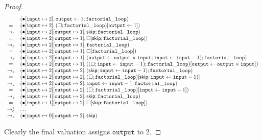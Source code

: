\documentclass{amsbook}
\theoremstyle{definition}
\theoremstyle{remark}
\numberwithin{section}{chapter}
\numberwithin{equation}{chapter}
\begin{document}
\begin{proof}
  $$\begin{array}{cl}
    & (\bullet[\mathtt{input} \mapsto 2], \mathtt{output} \leftarrow 1; \mathtt{factorial\_loop}) \\
    = & (\bullet[\mathtt{input} \mapsto 2], (\Box; \mathtt{factorial\_loop})[\mathtt{output} \leftarrow 1]) \\
    \to_\mathsf{c} & (\bullet[\mathtt{input} \mapsto 2][\mathtt{output} \mapsto 1], \mathsf{skip}; \mathtt{factorial\_loop}) \\
    = & (\bullet[\mathtt{input} \mapsto 2][\mathtt{output} \mapsto 1], \Box[\mathsf{skip}; \mathtt{factorial\_loop}]) \\
    \to_\mathsf{c} & (\bullet[\mathtt{input} \mapsto 2][\mathtt{output} \mapsto 1], \mathtt{factorial\_loop}) \\
    = & (\bullet[\mathtt{input} \mapsto 2][\mathtt{output} \mapsto 1], \Box[\mathtt{factorial\_loop}]) \\
    \to_\mathsf{c} & (\bullet[\mathtt{input} \mapsto 2][\mathtt{output} \mapsto 1], (\mathtt{output} \leftarrow \mathtt{output} \times \mathtt{input}; \mathtt{input} \leftarrow \mathtt{input} - 1); \mathtt{factorial\_loop}) \\
    = & (\bullet[\mathtt{input} \mapsto 2][\mathtt{output} \mapsto 1], ((\Box; \mathtt{input} \leftarrow \mathtt{input} - 1); \mathtt{factorial\_loop})[\mathtt{output} \leftarrow \mathtt{output} \times \mathtt{input}]) \\
    \to_\mathsf{c} & (\bullet[\mathtt{input} \mapsto 2][\mathtt{output} \mapsto 2], (\mathsf{skip}; \mathtt{input} \leftarrow \mathtt{input} - 1); \mathtt{factorial\_loop}) \\
    = & (\bullet[\mathtt{input} \mapsto 2][\mathtt{output} \mapsto 2], (\Box; \mathtt{factorial\_loop})[\mathsf{skip}; \mathtt{input} \leftarrow \mathtt{input} - 1)] \\
    \to_\mathsf{c} & (\bullet[\mathtt{input} \mapsto 2][\mathtt{output} \mapsto 2], \mathtt{input} \leftarrow \mathtt{input} - 1; \mathtt{factorial\_loop}) \\
    = & (\bullet[\mathtt{input} \mapsto 2][\mathtt{output} \mapsto 2], (\Box; \mathtt{factorial\_loop})[\mathtt{input} \leftarrow \mathtt{input} - 1]) \\
    \to_\mathsf{c} & (\bullet[\mathtt{input} \mapsto 1][\mathtt{output} \mapsto 2], \mathsf{skip}; \mathtt{factorial\_loop}) \\
    = & (\bullet[\mathtt{input} \mapsto 1][\mathtt{output} \mapsto 2], \Box[\mathsf{skip}; \mathtt{factorial\_loop}]) \\
    \to^*_\mathsf{c} & \ldots \\
    \to_\mathsf{c} & (\bullet[\mathtt{input} \mapsto 0][\mathtt{output} \mapsto 2], \mathsf{skip})
  \end{array}$$

  Clearly the final valuation assigns $\mathtt{output}$ to 2.
\end{proof}
\end{document}
